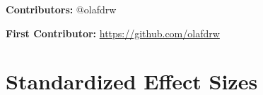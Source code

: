 \documentclass[12pt]{article}
\begin{document}
\noindent\textbf{Contributors:} @olafdrw

\noindent\textbf{First Contributor:} \url{https://github.com/olafdrw}

\label{apep_main_text_end}
\newpage


\newpage
\appendix

\section{Standardized Effect Sizes}
\label{sec:sde}

\begin{table}[H]
\centering
\caption{Standardized Effect Sizes for Main Outcomes}
\label{tab:sde}
\begin{threeparttable}
\end{threeparttable}
\end{table}
\end{document}
